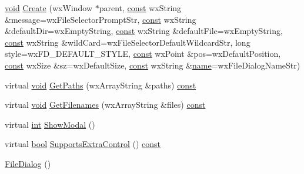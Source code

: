 \begin{DoxyCompactItemize}
\item 
\hyperlink{sound_8c_ae35f5844602719cf66324f4de2a658b3}{void} \hyperlink{class_file_dialog_a9f98de2f99539f5dad4b940842ba0f29}{Create} (wx\+Window $\ast$parent, \hyperlink{getopt1_8c_a2c212835823e3c54a8ab6d95c652660e}{const} wx\+String \&message=wx\+File\+Selector\+Prompt\+Str, \hyperlink{getopt1_8c_a2c212835823e3c54a8ab6d95c652660e}{const} wx\+String \&default\+Dir=wx\+Empty\+String, \hyperlink{getopt1_8c_a2c212835823e3c54a8ab6d95c652660e}{const} wx\+String \&default\+File=wx\+Empty\+String, \hyperlink{getopt1_8c_a2c212835823e3c54a8ab6d95c652660e}{const} wx\+String \&wild\+Card=wx\+File\+Selector\+Default\+Wildcard\+Str, long style=wx\+F\+D\+\_\+\+D\+E\+F\+A\+U\+L\+T\+\_\+\+S\+T\+Y\+LE, \hyperlink{getopt1_8c_a2c212835823e3c54a8ab6d95c652660e}{const} wx\+Point \&pos=wx\+Default\+Position, \hyperlink{getopt1_8c_a2c212835823e3c54a8ab6d95c652660e}{const} wx\+Size \&sz=wx\+Default\+Size, \hyperlink{getopt1_8c_a2c212835823e3c54a8ab6d95c652660e}{const} wx\+String \&\hyperlink{lib_2expat_8h_a1b49b495b59f9e73205b69ad1a2965b0}{name}=wx\+File\+Dialog\+Name\+Str)
\item 
virtual \hyperlink{sound_8c_ae35f5844602719cf66324f4de2a658b3}{void} \hyperlink{class_file_dialog_a0181bb90e4d72427257068a8627b5655}{Get\+Paths} (wx\+Array\+String \&paths) \hyperlink{getopt1_8c_a2c212835823e3c54a8ab6d95c652660e}{const} 
\item 
virtual \hyperlink{sound_8c_ae35f5844602719cf66324f4de2a658b3}{void} \hyperlink{class_file_dialog_af226bdb23f7fc3e733dc51e4fe16bcdd}{Get\+Filenames} (wx\+Array\+String \&files) \hyperlink{getopt1_8c_a2c212835823e3c54a8ab6d95c652660e}{const} 
\item 
virtual \hyperlink{xmltok_8h_a5a0d4a5641ce434f1d23533f2b2e6653}{int} \hyperlink{class_file_dialog_ab1592208e8f7e6a877e2f5a162689bc9}{Show\+Modal} ()
\item 
virtual \hyperlink{mac_2config_2i386_2lib-src_2libsoxr_2soxr-config_8h_abb452686968e48b67397da5f97445f5b}{bool} \hyperlink{class_file_dialog_a4a85aea18bfec07110fc81af35e1bca8}{Supports\+Extra\+Control} () \hyperlink{getopt1_8c_a2c212835823e3c54a8ab6d95c652660e}{const} 
\item 
\hyperlink{class_file_dialog_aa83fcb95b06464c2a57dd45ba353d94e}{File\+Dialog} ()
\item 

\end{DoxyCompactItemize}
